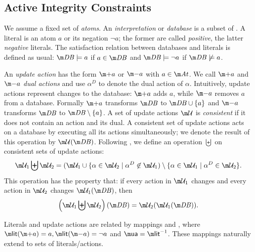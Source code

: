 % 
% 

\subsection{Active Integrity Constraints}
We assume a fixed set \atoms of \emph{atoms}. An \emph{interpretation} or \emph{database} is a subset of \atoms. A literal is an atom $a$ or its negation $\lnot a$; the former are called \emph{positive}, the latter \emph{negative} literals. 
The satisfaction relation between databases \db and literals is defined as usual: $\db \models a$ if $a\in\db$ and $\db \models \lnot a$ if $\db\not\models a$.

An \emph{update action} has the form $\add a$ or $\remove a$ with $a\in \atoms$. We call $\add a$ and $\remove a$ \emph{dual actions} and use $\alpha^D$ to denote the dual action of $\alpha$. 
Intuitively, update actions represent changes to the database: $\add a$ adds $a$, while $\remove a$ removes $a$ from a database. Formally $\add a$ transforms $\db$ to $\db\cup\{a\}$ and $\remove a $ transforms $\db$ to $\db\setminus\{a\}$. 
A set of update actions $\UU$ is \emph{consistent} if it does not contain an action and its dual. A consistent set of update actions \UU acts on a database \db by executing all its actions simultaneously; we denote the result of this operation by $\UU(\db)$. 
Following \citet{iclp/Cruz-Filipe16}, we define an operation $\biguplus$ on consistent sets of update actions: 
\[\UU_1 \biguplus \UU_2 = (\UU_1 \cup \{\alpha \in \UU_2 \mid \alpha^D\not \in \UU_1) \setminus \{\alpha\in \UU_1 \mid \alpha^D\in \UU_2\}.\]
This operation has the property that: if every action in $\UU_1$ changes \db and every action in $\UU_2$ changes $\UU_1(\db)$, then 
\[\left(\UU_1\biguplus \UU_2\right)(\db) = \UU_2(\UU_1(\db)).\]

Literals and update actions are related by mappings \litof and \actof, where $\litof(\add a)= a, \litof(\remove a) = \lnot a$ and $\actof = \litof^{-1}$.
These mappings naturally extend to sets of literals/actions. 

